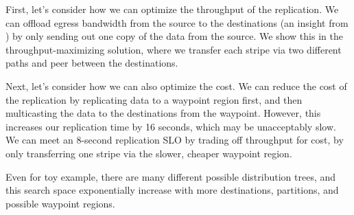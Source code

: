 First, let's consider how we can optimize the throughput of the replication. We can offload egress bandwidth from the source to the destinations (an insight from \cite{castro2003splitstream}) by only sending out one copy of the data from the source. We show this in the throughput-maximizing solution, where we transfer each stripe via two different paths and peer between the destinations. 

Next, let's consider how we can also optimize the cost.  We can reduce the cost of the replication by replicating data to a waypoint region first, and then multicasting the data to the destinations from the waypoint. However, this increases our replication time by 16 seconds, which may be unacceptably slow. We can meet an 8-second replication SLO by trading off throughput for cost, by only transferring one stripe via the slower, cheaper waypoint region. 

Even for toy example, there are many different possible distribution trees, and this search space exponentially increase with more destinations, partitions, and possible waypoint regions. 




